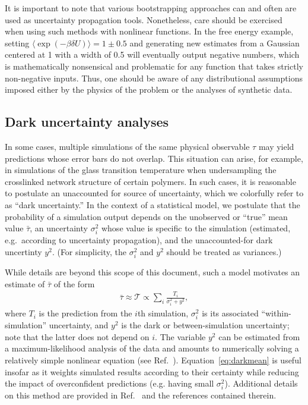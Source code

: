 It is important to note that various bootstrapping approaches can and often are used as uncertainty propagation tools.  Nonetheless, care should be exercised when using such methods with nonlinear functions.  In the free energy example, setting $\langle \exp(-\beta \delta U)\rangle = 1 \pm 0.5$ and generating new estimates from a Gaussian centered at 1 with a width of 0.5 will eventually output negative numbers, which is mathematically nonsensical and problematic for any function that takes strictly non-negative inputs.  Thus, one should be aware of any distributional assumptions imposed either by the physics of the problem or the analyses of synthetic data.


\subsection{Dark uncertainty analyses}

In some cases, multiple simulations of the same physical observable $\tau$ may yield predictions whose error bars do not overlap.  This situation can arise, for example, in simulations of the glass transition temperature when undersampling the crosslinked network structure of certain polymers.  In such cases, it is reasonable to postulate an unaccounted for source of uncertainty, which we colorfully refer to as ``dark uncertainty.''  In the context of a statistical model, we postulate that the probability of a simulation output depends on the unobserved or ``true'' mean value $\bar \tau$, an uncertainty $\sigma_i^2$ whose value is specific to the simulation (estimated, e.g.\ according to uncertainty propagation), and the unaccounted-for dark uncertinty $y^2$.  (For simplicity, the $\sigma_i^2$ and $y^2$ should be treated as variances.)  

While details are beyond this scope of this document, such a model motivates an estimate of $\bar \tau$ of the form 
\begin{align}
\bar \tau \approx \mathcal T \propto \sum_i \frac{T_i}{\sigma_i^2 + y^2}, \label{eq:darkmean}
\end{align}
where $T_i$ is the prediction from the $i$th simulation, $\sigma_i^2$ is its associated ``within-simulation'' uncertainty, and $y^2$ is the dark or between-simulation uncertainty; note that the latter does not depend on $i$.  The variable $y^2$ can be estimated from a maximum-likelihood analysis of the data and amounts to numerically solving a relatively simple nonlinear equation (see Ref.~\cite{patrone1}).  Equation~\eqref{eq:darkmean} is useful insofar as it weights simulated results according to their certainty while reducing the impact of overconfident predictions (e.g. having small $\sigma_i^2$).  Additional details on this method are provided in Ref.~\cite{patrone1} and the references contained therein.



